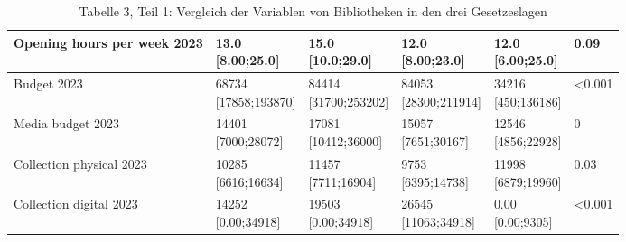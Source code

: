 \documentclass[a4paper,
fontsize=11pt,
oneside,
numbers=noperiodatend,
parskip=half-,
bibliography=totoc,
final
]{scrartcl}
\begin{document}
\begin{landscape}
\begin{table}[]
\begin{tabular}{|l|l|l|l|l|l|}
Opening hours per week 2023      & \makecell{13.0 \\ {[}8.00;25.0{]}}     & \makecell{15.0 \\ {[}10.0;29.0{]}}     & \makecell{12.0 \\ {[}8.00;23.0{]}}     & \makecell{12.0 \\ {[}6.00;25.0{]}}   & 0.09               \\ \hline
Budget 2023                      & \makecell{68734 \\ {[}17858;193870{]}} & \makecell{84414 \\ {[}31700;253202{]}} & \makecell{84053 \\ {[}28300;211914{]}} & \makecell{34216 \\ {[}450;136186{]}} & \textless{}0.001   \\ \hline
Media budget 2023                & \makecell{14401 \\ {[}7000;28072{]}}   & \makecell{17081 \\ {[}10412;36000{]}}  & \makecell{15057 \\ {[}7651;30167{]}}   & \makecell{12546 \\ {[}4856;22928{]}} & 0                  \\ \hline
Collection physical 2023         & \makecell{10285 \\ {[}6616;16634{]}}   & \makecell{11457 \\ {[}7711;16904{]}}   & \makecell{9753 \\ {[}6395;14738{]}}    & \makecell{11998 \\ {[}6879;19960{]}} & 0.03               \\ \hline
Collection digital 2023          & \makecell{14252 \\ {[}0.00;34918{]}}   & \makecell{19503 \\ {[}0.00;34918{]}}   & \makecell{26545 \\ {[}11063;34918{]}}  & \makecell{0.00 \\ {[}0.00;9305{]}}   & \textless{}0.001   \\ \hline
\end{tabular}
\caption{Tabelle 3, Teil 1: Vergleich der Variablen von Bibliotheken in den drei Gesetzeslagen}
\end{table}
\end{landscape}
\end{document}
